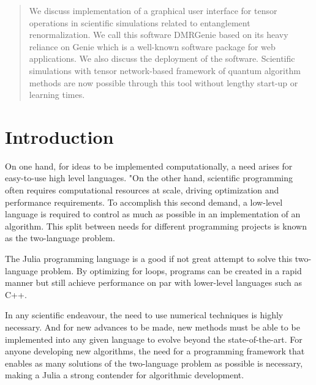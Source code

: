 \documentclass{juliacon}
\begin{document}


\maketitle

\begin{abstract}

We discuss implementation of a graphical user interface for tensor operations in scientific simulations related to entanglement renormalization. We call this software DMRGenie based on its heavy reliance on Genie which is a well-known software package for web applications. We also discuss the deployment of the software. Scientific simulations with tensor network-based framework of quantum algorithm methods are now possible through this tool without lengthy start-up or learning times.

\end{abstract}


\section{Introduction}

On one hand, for ideas to be implemented computationally, a need arises for easy-to-use high level languages. "On the other hand, scientific programming often requires computational resources at scale, driving optimization and performance requirements. To accomplish this second demand, a low-level language is required to control as much as possible in an implementation of an algorithm. This split between needs for different programming projects is known as the two-language problem.

The Julia programming language is a good if not great attempt to solve this two-language problem. By optimizing for loops, programs can be created in a rapid manner but still achieve performance on par with lower-level languages such as C++. 

In any scientific endeavour, the need to use numerical techniques is highly necessary. And for new advances to be made, new methods must be able to be implemented into any given language to evolve beyond the state-of-the-art. For anyone developing new algorithms, the need for a programming framework that enables as many solutions of the two-language problem as possible is necessary, making a Julia a strong contender for algorithmic development.

\end{document}
